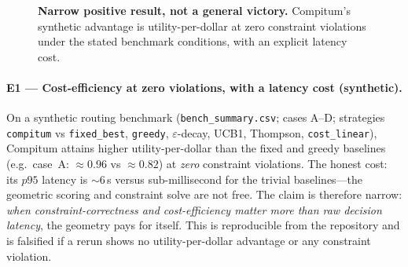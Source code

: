 \documentclass[11pt]{article}
\theoremstyle{plain}
\theoremstyle{definition}
\theoremstyle{remark}
\newcommand{\code}[1]{\texttt{#1}}
\begin{document}
\begin{figure}[t]
\centering
{}
\caption{\textbf{Narrow positive result, not a general victory.} Compitum's synthetic
advantage is utility-per-dollar at zero constraint violations under the stated benchmark
conditions, with an explicit latency cost.}
\label{fig:bench}
\end{figure}

\paragraph{E1 --- Cost-efficiency at zero violations, with a latency cost (synthetic).}
On a synthetic routing benchmark (\code{bench\_summary.csv}; cases A--D; strategies
\code{compitum} vs \code{fixed\_best}, \code{greedy}, $\varepsilon$-decay, UCB1, Thompson,
\code{cost\_linear}), Compitum attains higher utility-per-dollar than the fixed and greedy
baselines (e.g.\ case~A: $\approx 0.96$ vs $\approx 0.82$) at \emph{zero} constraint
violations. The honest cost: its $p95$ latency is $\sim\!6$\,s versus sub-millisecond for the
trivial baselines---the geometric scoring and constraint solve are not free. The claim is
therefore narrow: \emph{when constraint-correctness and cost-efficiency matter more than raw
decision latency}, the geometry pays for itself. This is reproducible from the repository and
is falsified if a rerun shows no utility-per-dollar advantage or any constraint violation.
\end{document}
